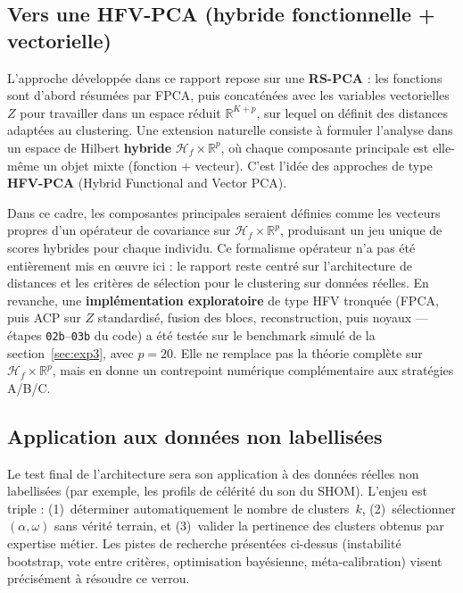 \documentclass[11pt, a4paper]{article}
\newcommand{\R}{\mathbb{R}}
\begin{document}
\subsection{Vers une HFV-PCA (hybride fonctionnelle + vectorielle)}

L'approche développée dans ce rapport repose sur une \textbf{RS-PCA} :
les fonctions sont d'abord résumées par FPCA, puis concaténées avec les
variables vectorielles $Z$ pour travailler dans un espace réduit
$\R^{K+p}$, sur lequel on définit des distances adaptées au clustering.
Une extension naturelle consiste à formuler l'analyse dans un espace de
Hilbert \textbf{hybride} $\mathcal{H}_f \times \R^p$, où chaque
composante principale est elle-même un objet mixte (fonction +
vecteur). C'est l'idée des approches de type \textbf{HFV-PCA}
(Hybrid Functional and Vector PCA).

Dans ce cadre, les composantes principales seraient définies comme les
vecteurs propres d'un opérateur de covariance sur
$\mathcal{H}_f \times \R^p$, produisant un jeu unique de scores
hybrides pour chaque individu. Ce formalisme opérateur n'a pas été
entièrement mis en \oe uvre ici : le rapport reste centré sur l'architecture
de distances et les critères de sélection pour le clustering sur données
réelles. En revanche, une \textbf{implémentation exploratoire} de type
HFV tronquée (FPCA, puis ACP sur $Z$ standardisé, fusion des blocs,
reconstruction, puis noyaux — étapes \texttt{02b}--\texttt{03b} du code)
a été testée sur le benchmark simulé de la section~\ref{sec:exp3}, avec
$p = 20$. Elle ne remplace pas la théorie complète sur
$\mathcal{H}_f \times \R^p$, mais en donne un contrepoint numérique
complémentaire aux stratégies A/B/C.

\subsection{Application aux données non labellisées}

Le test final de l'architecture sera son application à des données
réelles non labellisées (par exemple, les profils de célérité du son du
SHOM). L'enjeu est triple : (1)~déterminer automatiquement le nombre de
clusters~$k$, (2)~sélectionner $(\alpha, \omega)$ sans vérité terrain, et
(3)~valider la pertinence des clusters obtenus par expertise métier.
Les pistes de recherche présentées ci-dessus (instabilité bootstrap, vote entre
critères, optimisation bayésienne, méta-calibration) visent précisément
à résoudre ce verrou.
\end{document}
